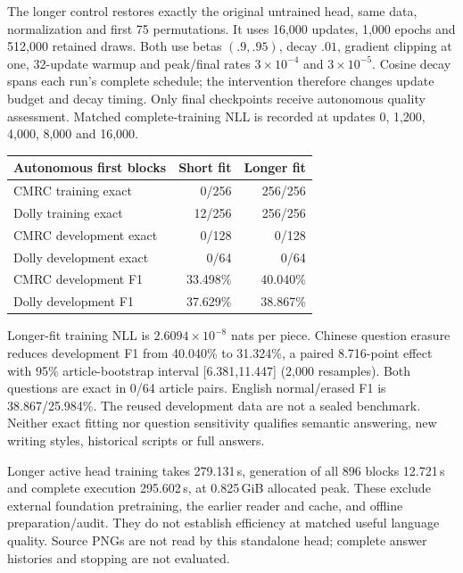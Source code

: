 \documentclass[10pt,a4paper]{article}
\begin{document}
The longer control restores exactly the original untrained head, same data,
normalization and first 75 permutations. It uses 16,000 updates, 1,000 epochs
and 512,000 retained draws. Both use betas $(.9,.95)$, decay $.01$, gradient
clipping at one, 32-update warmup and peak/final rates $3\times10^{-4}$ and
$3\times10^{-5}$. Cosine decay spans each run's complete schedule; the
intervention therefore changes update budget and decay timing. Only final
checkpoints receive autonomous quality assessment. Matched complete-training
NLL is recorded at updates 0, 1,200, 4,000, 8,000 and 16,000.

\begin{center}\begin{tabular}{lrr}
Autonomous first blocks & Short fit & Longer fit\\\hline
CMRC training exact & 0/256 & 256/256\\
Dolly training exact & 12/256 & 256/256\\
CMRC development exact & 0/128 & 0/128\\
Dolly development exact & 0/64 & 0/64\\
CMRC development F1 & 33.498\% & 40.040\%\\
Dolly development F1 & 37.629\% & 38.867\%\\
\end{tabular}\end{center}
Longer-fit training NLL is $2.6094\times10^{-8}$ nats per piece. Chinese
question erasure reduces development F1 from 40.040\% to 31.324\%, a paired
8.716-point effect with 95\% article-bootstrap interval [6.381,11.447]
(2,000 resamples). Both questions are exact in 0/64 article pairs. English
normal/erased F1 is 38.867/25.984\%. The reused development data are not a
sealed benchmark. Neither exact fitting nor question sensitivity qualifies
semantic answering, new writing styles, historical scripts or full answers.

Longer active head training takes 279.131\,s, generation of all 896 blocks
12.721\,s and complete execution 295.602\,s, at 0.825\,GiB allocated peak.
These exclude external foundation pretraining, the earlier reader and cache,
and offline preparation/audit. They do not establish efficiency at matched
useful language quality. Source PNGs are not read by this standalone head;
complete answer histories and stopping are not evaluated.
\end{document}
